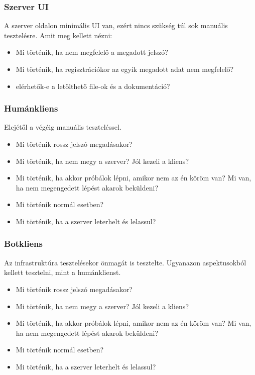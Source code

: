 \documentclass[twoside, a4paper, 12pt]{article}
\begin{document}
\subsubsection{Szerver UI}
A szerver oldalon minimális UI van, ezért nincs szükség túl sok manuális tesztelésre. Amit meg kellett nézni:
\begin{itemize}
	\item Mi történik, ha nem megfelelő a megadott jelszó?
	\item Mi történik, ha regisztrációkor az egyik megadott adat nem megfelelő?
	\item elérhetők-e a letölthető file-ok és a dokumentáció?
\end{itemize}

\subsubsection{Humánkliens}
Elejétől a végéig manuális teszteléssel.
\begin{itemize}
	\item Mi történik rossz jelszó megadásakor?
	\item Mi történik, ha nem megy a szerver? Jól kezeli a kliens?
	\item Mi történik, ha akkor próbálok lépni, amikor nem az én köröm van? Mi van, ha nem megengedett lépést akarok beküldeni?
	\item Mi történik normál esetben?
	\item Mi történik, ha a szerver leterhelt és lelassul?
\end{itemize}


\subsubsection{Botkliens}
Az infrastruktúra tesztelésekor önmagát is tesztelte. Ugyanazon aspektusokból kellett tesztelni, mint a humánklienst.
\begin{itemize}
	\item Mi történik rossz jelszó megadásakor?
	\item Mi történik, ha nem megy a szerver? Jól kezeli a kliens?
	\item Mi történik, ha akkor próbálok lépni, amikor nem az én köröm van? Mi van, ha nem megengedett lépést akarok beküldeni?
	\item Mi történik normál esetben?
	\item Mi történik, ha a szerver leterhelt és lelassul?
\end{itemize}
\end{document}
